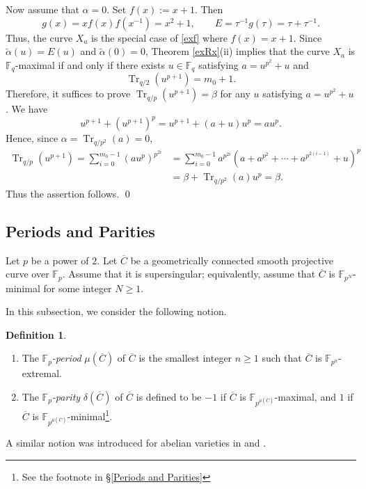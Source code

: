 \documentclass[12pt,a4paper]{amsart}
\theoremstyle{definition}
\newtheorem{definition}[theorem]{Definition}
\def\F{{\mathbb F}}
\theoremstyle{remark}
\DeclareMathOperator{\Tr}{Tr}
\begin{document}
{\medskip

Now assume that $\alpha=0$. 
Set $f(x):=x+1$. Then 
\[g(x)=xf(x) f(x^{-1})=x^2+1,\qquad E=\tau^{-1} g(\tau)=\tau+\tau^{-1}. \]
Thus, the curve $X_a$ is the special case of \eqref{exf} where $f(x)=x+1$. Since 
$\widetilde{\alpha}(u)=E(u)$ and 
$\widetilde{\alpha}(0)=0$,  
Theorem \ref{exRx}(ii) implies that 
the curve $X_a$ is $\F_q$-maximal if and only if there exists $u\in \F_q$ satisfying $a=u^{p^2}+u$ and 
\[\Tr_{q/2}(u^{p+1})=m_0+1.
\]
Therefore, it suffices to prove $\Tr_{q/p}(u^{p+1})=\beta$ for any $u$ satisfying $a=u^{p^2}+u$. We have 
\[u^{p+1}+(u^{p+1})^p=u^{p+1}+(a+u)u^p=au^p. \]
Hence, since $\alpha=\Tr_{q/p^2}(a)=0$, 
\begin{align*}
\Tr_{q/p}(u^{p+1})=\sum_{i=0}^{m_0-1}(au^p)^{p^{2i}}
&=\sum_{i=0}^{m_0-1}a^{p^{2i}}(a+a^{p^2}+\cdots+a^{p^{2(i-1)}}+u)^p \\
&=\beta+\Tr_{q/p^2}(a) u^p=\beta. 
\end{align*}
Thus the assertion follows. 
\qed}






\subsection{Periods and Parities}\label{periods}
Let $p$ be a power of $2$. 
Let $\overline{C}$ be a geometrically connected smooth projective curve over $\mathbb{F}_p$. Assume that it is supersingular; equivalently, assume that $\overline{C}$ is $\mathbb{F}_{p^N}$-minimal for some integer $N \geq 1$. 

In this subsection, we consider the following notion. 
\begin{definition}
    \begin{enumerate}
        \item The \emph{$\F_p$-period} $\mu(\overline{C})$ of $\overline{C}$ is the smallest integer $n \geq 1$ such that $\overline{C}$ is $\mathbb{F}_{p^n}$-extremal.
        \item The \emph{$\F_p$-parity} $\delta(\overline{C})$ of $\overline{C}$ is defined to be $-1$ if $\overline{C}$ is $\F_{p^{\mu(\overline{C})}}$-maximal,  and $1$ if $\overline{C}$ is $\F_{p^{\mu(\overline{C})}}$-minimal\footnote{See the footnote in \S\ref{Periods and Parities}}. 
    \end{enumerate}
\end{definition}
 A similar notion was introduced for abelian varieties in \cite[Definition 4.1]{KP} and \cite[Section 2]{SX}. 
\end{document}
